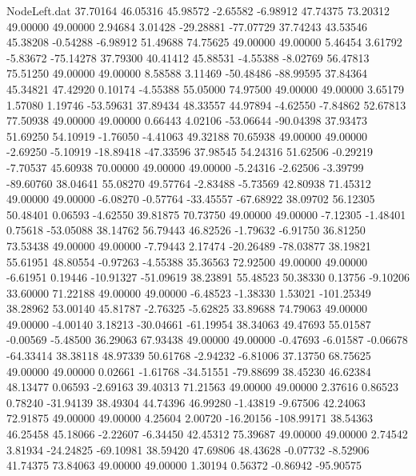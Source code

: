 \begin{filecontents}{NodeLeft.dat}
  37.70164   46.05316   45.98572    -2.65582   -6.98912   47.74375   73.20312   49.00000   49.00000    2.94684    3.01428  -29.28881  -77.07729
  37.74243   43.53546   45.38208    -0.54288   -6.98912   51.49688   74.75625   49.00000   49.00000    5.46454    3.61792   -5.83672  -75.14278
  37.79300   40.41412   45.88531    -4.55388   -8.02769   56.47813   75.51250   49.00000   49.00000    8.58588    3.11469  -50.48486  -88.99595
  37.84364   45.34821   47.42920     0.10174   -4.55388   55.05000   74.97500   49.00000   49.00000    3.65179    1.57080    1.19746  -53.59631
  37.89434   48.33557   44.97894    -4.62550   -7.84862   52.67813   77.50938   49.00000   49.00000    0.66443    4.02106  -53.06644  -90.04398
  37.93473   51.69250   54.10919    -1.76050   -4.41063   49.32188   70.65938   49.00000   49.00000   -2.69250   -5.10919  -18.89418  -47.33596
  37.98545   54.24316   51.62506    -0.29219   -7.70537   45.60938   70.00000   49.00000   49.00000   -5.24316   -2.62506   -3.39799  -89.60760
  38.04641   55.08270   49.57764    -2.83488   -5.73569   42.80938   71.45312   49.00000   49.00000   -6.08270   -0.57764  -33.45557  -67.68922
  38.09702   56.12305   50.48401     0.06593   -4.62550   39.81875   70.73750   49.00000   49.00000   -7.12305   -1.48401    0.75618  -53.05088
  38.14762   56.79443   46.82526    -1.79632   -6.91750   36.81250   73.53438   49.00000   49.00000   -7.79443    2.17474  -20.26489  -78.03877
  38.19821   55.61951   48.80554    -0.97263   -4.55388   35.36563   72.92500   49.00000   49.00000   -6.61951    0.19446  -10.91327  -51.09619
  38.23891   55.48523   50.38330     0.13756   -9.10206   33.60000   71.22188   49.00000   49.00000   -6.48523   -1.38330    1.53021 -101.25349
  38.28962   53.00140   45.81787    -2.76325   -5.62825   33.89688   74.79063   49.00000   49.00000   -4.00140    3.18213  -30.04661  -61.19954
  38.34063   49.47693   55.01587    -0.00569   -5.48500   36.29063   67.93438   49.00000   49.00000   -0.47693   -6.01587   -0.06678  -64.33414
  38.38118   48.97339   50.61768    -2.94232   -6.81006   37.13750   68.75625   49.00000   49.00000    0.02661   -1.61768  -34.51551  -79.88699
  38.45230   46.62384   48.13477     0.06593   -2.69163   39.40313   71.21563   49.00000   49.00000    2.37616    0.86523    0.78240  -31.94139
  38.49304   44.74396   46.99280    -1.43819   -9.67506   42.24063   72.91875   49.00000   49.00000    4.25604    2.00720  -16.20156 -108.99171
  38.54363   46.25458   45.18066    -2.22607   -6.34450   42.45312   75.39687   49.00000   49.00000    2.74542    3.81934  -24.24825  -69.10981
  38.59420   47.69806   48.43628    -0.07732   -8.52906   41.74375   73.84063   49.00000   49.00000    1.30194    0.56372   -0.86942  -95.90575

\end{filecontents}
